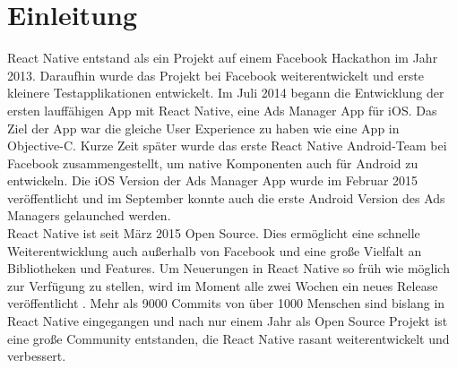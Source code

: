 \section{Einleitung}
React Native entstand als ein Projekt auf einem Facebook Hackathon im Jahr 2013. Daraufhin wurde das Projekt bei Facebook weiterentwickelt und erste kleinere Testapplikationen entwickelt. Im Juli 2014 begann die Entwicklung der ersten lauffähigen App mit React Native, eine Ads Manager App für iOS. Das Ziel der App war die gleiche User Experience zu haben wie eine App in Objective-C. Kurze Zeit später wurde das erste React Native Android-Team bei Facebook zusammengestellt, um native Komponenten auch für Android zu entwickeln. Die iOS Version der Ads Manager App wurde im Februar 2015 veröffentlicht und im September konnte auch die erste Android Version des Ads Managers gelaunched werden. \\

React Native ist seit März 2015 Open Source. Dies ermöglicht eine schnelle Weiterentwicklung auch außerhalb von Facebook und eine große Vielfalt an Bibliotheken und Features. Um Neuerungen in React Native so früh wie möglich zur Verfügung zu stellen, wird im Moment alle zwei Wochen ein neues Release veröffentlicht \cite{Konicek_review_2016}. Mehr als 9000 Commits von über 1000 Menschen sind bislang in React Native eingegangen und nach nur einem Jahr als Open Source Projekt ist eine große Community entstanden, die React Native rasant weiterentwickelt und verbessert.